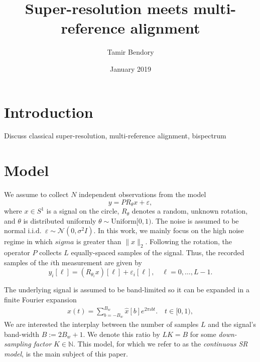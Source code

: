 \documentclass[english,12pt]{article}
\newcommand{\I}{\iota}
\newcommand{\tB}{B_w}
\numberwithin{equation}{section}
\begin{document}
\title{Super-resolution meets multi-reference alignment}

\author{Tamir Bendory}
\date{January 2019}
\maketitle


\section{Introduction}

Discuss classical super-resolution, multi-reference alignment, bispectrum

\section{Model}

We assume to collect $N$ independent observations from the model 
\begin{equation}
y = PR_\theta x + \varepsilon,
\end{equation}
where $x\in S^1$ is a signal on the circle, $R_\theta$ denotes a random, unknown rotation, and $\theta$ is distributed uniformly $\theta\sim \text{Uniform}[0,1)$. 
The noise is assumed to be normal i.i.d.\  $\varepsilon\sim\mathcal{N}(0,\sigma^2 I)$.
In this work, we mainly focus on the high noise regime in which $sigma$ is greater than $\|x\|_2$. 
Following the rotation, 
the operator $P$ collects $L$ equally-spaced samples of the signal. Thus, the recorded samples of the $i$th measurement are given by 
\begin{equation}
y_i[\ell] = \left(R_{\theta_i} x\right)[\ell] + \varepsilon_i[\ell], \quad \ell=0,\ldots,L-1.
\end{equation}


The underlying  signal  is assumed to be band-limited so it can be expanded in a finite Fourier expansion 
\begin{eqnarray} \label{eq:fourier_expansion}
x(t) = \sum_{b=-\tB}^{\tB}\hat{x}[b]e^{2\pi\I bt }. \quad t\in[0,1),
\end{eqnarray}
We are interested the interplay between the number of samples $L$ and the signal's band-width $B := 2\tB+1$. We denote this ratio by  $LK=B$ for some \emph{down-sampling factor} $K\in\mathbb{N}$.  
This model, for which we refer to as the \emph{continuous SR model}, is the main subject of this paper. 
\end{document}
